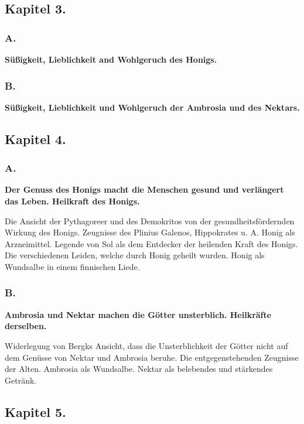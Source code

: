 \documentclass[a4paper, 11pt, oneside]{article}
\begin{document}
\subsection*{Kapitel 3.}

\subsubsection*{A.}

\textbf{Süßigkeit, Lieblichkeit and Wohlgeruch des Honigs.}

\subsubsection*{B.}

\textbf{Süßigkeit, Lieblichkeit und Wohlgeruch der Ambrosia und des Nektars.}

\subsection*{Kapitel 4.}

\subsubsection*{A.}

\textbf{Der Genuss des Honigs macht die Menschen gesund und verlängert das Leben. Heilkraft des Honigs.}

Die Ansicht der Pythagoreer und des Demokritos von der gesundheitsfördernden Wirkung des Honigs. Zeugnisse des Plinius Galenos, Hippokrates u. A. Honig als Arzneimittel. Legende von Sol als dem Entdecker der heilenden Kraft des Honigs. Die verschiedenen Leiden, welche durch Honig geheilt wurden. Honig als Wundsalbe in einem finnischen Liede.

\subsubsection*{B.}

\textbf{Ambrosia und Nektar machen die Götter unsterblich. Heilkräfte derselben.}

Widerlegung von Bergks Ansicht, dass die Unsterblichkeit der Götter nicht auf dem Genüsse von Nektar und Ambrosia beruhe. Die entgegenstehenden Zeugnisse der Alten. Ambrosia als Wundsalbe. Nektar als belebendes und stärkendes Getränk.

\subsection*{Kapitel 5.}
\end{document}
